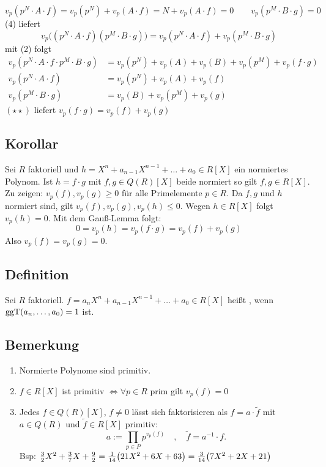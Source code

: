 \[
	v_p(p^N \cdot A \cdot f) = v_p(p^N)+ v_p(A \cdot f) = N + v_p(A \cdot f) = 0 \qquad v_p(p^M \cdot B \cdot g) = 0
\]
(4) liefert 
\[
	v_p\big((p^N \cdot A \cdot f)(p^M \cdot B \cdot g) \big) = v_p(p^N \cdot A \cdot f) + v_p(p^M \cdot B \cdot g) \tag{$\star\star$}
\]
mit (2) folgt
\begin{align*}
	v_p(p^N \cdot A \cdot f \cdot p^M \cdot B \cdot g) &= v_p(p^N) + v_p(A) + v_p(B) + v_p(p^M) + v_p(f \cdot g) \\
	v_p(p^N \cdot A \cdot f) &= v_p(p^N) + v_p(A) + v_p(f) \\
	v_p(p^M \cdot B \cdot g) &= v_p(B) + v_p(p^M) + v_p(g)
\end{align*}
$(\star\star)$ liefert $v_p(f \cdot g) = v_p(f) + v_p(g)$ \bewende

\subsection[{Korollar: Normierte Faktoren von $h \in R[X]$ sind auch in $R[X]$}]{Korollar} %
\label{sub:814}
Sei $R$ faktoriell und $h=X^n + a_{n-1} X^{n-1} + \ldots + a_0 \in R[X]$ ein normiertes Polynom. Ist $h=f \cdot g$ mit $f,g \in Q(R)[X]$ beide normiert so gilt 
$f,g  \in R[X]$.
Zu zeigen: $v_p(f), v_p(g) \ge 0$ für alle Primelemente $p \in R$. Da $f,g$ und $h$ normiert sind, gilt $v_p(f), v_p(g), v_p(h) \le 0$. Wegen $h \in R[X]$ folgt $v_p(h)=0$. Mit dem Gauß-Lemma folgt: 
\[
	0 = v_p(h)= v_p(f \cdot g) = v_p(f) + v_p(g) 
\]
Also $v_p(f)= v_p(g)=0$. \bewende

\subsection[Definition: Primitives Polynom]{Definition} %
\label{sub:815}
Sei $R$ faktoriell. $f= a_n X^n + a_{n-1} X^{n-1} + \ldots + a_0 \in R[X]$ heißt , wenn $\operatorname{ggT}(a_n, \ldots , a_0)=1$ ist.

\subsection[Bemerkungen zu primitiven Polynomen]{Bemerkung} %
\label{sub:816}
\begin{enumerate}[(1)]
	\item Normierte Polynome sind primitiv.
	\item $f \in R[X]$ ist primitiv $\iff \forall  p \in R $ prim gilt $v_p(f)= 0$
	\item Jedes $f \in Q(R)[X]$, $f\not= 0$ lässt sich faktorisieren als $f= a \cdot \tilde f$ mit $a \in Q(R)$ und $\tilde f \in R[X]$ primitiv:
	\[
		a := \prod_{p \in P} p^{v_p(f)} \quad , \quad \tilde f = a ^{-1} \cdot f.
	\]
	Bsp: $\frac{3}{2} X^2 + \frac{3}{7}X + \frac{9}{2}  = \frac{1}{14} \enbrace*{21 X^2 +6 X + 63}  = \frac{3}{14} \enbrace*{7 X^2 +2 X + 21}$
\end{enumerate}

